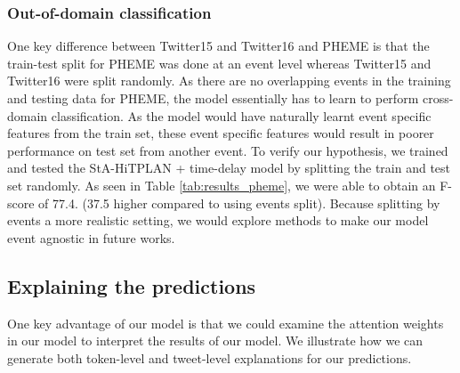 \documentclass[letterpaper]{article} %
\begin{document}
\subsubsection{Out-of-domain classification}
\label{out-of-domain classification}
One key difference between Twitter15 and Twitter16 and PHEME is that the train-test split for PHEME was done at an event level whereas Twitter15 and Twitter16 were split randomly. As there are no overlapping events in the training and testing data for PHEME, the model essentially has to learn to perform cross-domain classification. As the model would have naturally learnt event specific features from the train set, these event specific features would result in poorer performance on test set from another event. To verify our hypothesis, we trained and tested the StA-HiTPLAN + time-delay model by splitting the train and test set randomly. As seen in Table \ref{tab:results_pheme}, we were able to obtain an F-score of 77.4. (37.5 higher compared to using events split). Because splitting by events a more realistic setting, we would explore methods to make our model event agnostic in future works.

\subsection{Explaining the predictions} \label{explainability}
One key advantage of our model is that we could examine the attention weights in our model to interpret the results of our model. We illustrate how we can generate both token-level and tweet-level explanations for our predictions.
\end{document}
